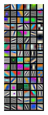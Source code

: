 \documentclass{article}
\begin{document}
\begin{figure}[h]
  \begin{minipage}[b]{0.48\linewidth}
  	\includegraphics[width=\textwidth]{img/first.png}

\end{minipage}
\end{figure}
\end{document}
